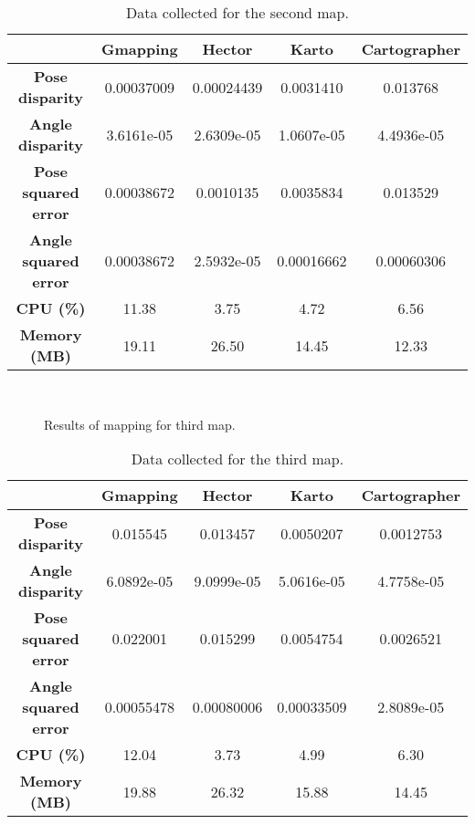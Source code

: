 \begin{table}[!ht]
\centering
\renewcommand*{\arraystretch}{1.1}
\begin{tabular}{c|c|c|c|c}
& \textbf{Gmapping} & \textbf{Hector} & \textbf{Karto} & \textbf{Cartographer} \\ \hline
\textbf{Pose disparity} & 0.00037009 & 0.00024439 & 0.0031410 & 0.013768 \\
\textbf{Angle disparity} & 3.6161e-05 & 2.6309e-05 & 1.0607e-05 & 4.4936e-05 \\
\textbf{Pose squared error} & 0.00038672 & 0.0010135 & 0.0035834 & 0.013529 \\
\textbf{Angle squared error} & 0.00038672 & 2.5932e-05 & 0.00016662 & 0.00060306 \\
\textbf{CPU (\%)} & 11.38 & 3.75 & 4.72 & 6.56 \\
\textbf{Memory (MB)} & 19.11 & 26.50 & 14.45 & 12.33 \\ \hline
\end{tabular}
\caption{Data collected for the second map.}
\label{tab:results2}
\end{table}

\begin{figure}[!ht]
     \centering
     \hspace{1cm}
     \\
     \hspace{1cm}
     \caption{Results of mapping for third map.}
     \label{fig:results3}
\end{figure}

\begin{table}[!ht]
\centering
\renewcommand*{\arraystretch}{1.1}
\begin{tabular}{c|c|c|c|c}
& \textbf{Gmapping} & \textbf{Hector} & \textbf{Karto} & \textbf{Cartographer} \\ \hline
\textbf{Pose disparity} & 0.015545 & 0.013457 & 0.0050207 & 0.0012753 \\
\textbf{Angle disparity} & 6.0892e-05 & 9.0999e-05 & 5.0616e-05 & 4.7758e-05 \\
\textbf{Pose squared error} & 0.022001 & 0.015299 & 0.0054754 & 0.0026521 \\
\textbf{Angle squared error} & 0.00055478 & 0.00080006 & 0.00033509 & 2.8089e-05 \\
\textbf{CPU (\%)} & 12.04 & 3.73 & 4.99 & 6.30 \\
\textbf{Memory (MB)} & 19.88 & 26.32 & 15.88 & 14.45 \\ \hline
\end{tabular}
\caption{Data collected for the third map.}
\label{tab:results3}
\end{table}
\clearpage

